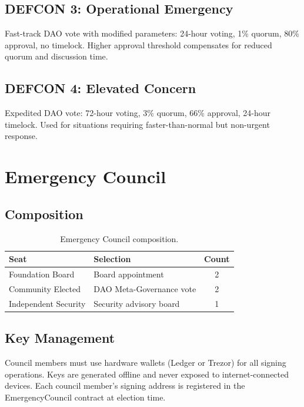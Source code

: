 \documentclass[11pt,letterpaper]{article}
\begin{document}
\subsection{DEFCON 3: Operational Emergency}

Fast-track DAO vote with modified parameters: 24-hour voting, 1\% quorum, 80\% approval, no timelock. Higher approval threshold compensates for reduced quorum and discussion time.

\subsection{DEFCON 4: Elevated Concern}

Expedited DAO vote: 72-hour voting, 3\% quorum, 66\% approval, 24-hour timelock. Used for situations requiring faster-than-normal but non-urgent response.

\section{Emergency Council}
\label{sec:council}

\subsection{Composition}

\begin{table}[h]
\centering
\caption{Emergency Council composition.}
\label{tab:council}
\begin{tabular}{llc}
\toprule
\textbf{Seat} & \textbf{Selection} & \textbf{Count} \\
\midrule
Foundation Board & Board appointment & 2 \\
Community Elected & DAO Meta-Governance vote & 2 \\
Independent Security & Security advisory board & 1 \\
\bottomrule
\end{tabular}
\end{table}

\subsection{Key Management}

Council members must use hardware wallets (Ledger or Trezor) for all signing operations. Keys are generated offline and never exposed to internet-connected devices. Each council member's signing address is registered in the EmergencyCouncil contract at election time.
\end{document}
